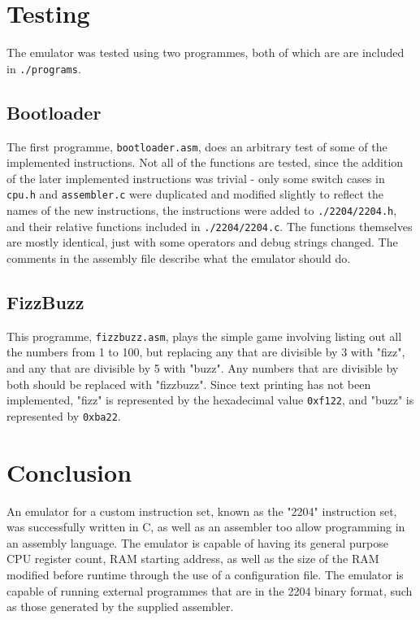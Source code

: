 \documentclass[a4paper,11pt]{article}
\begin{document}
\section{Testing}
    The emulator was tested using two programmes, both of which are are included in \lstinline{./programs}.
    
    \subsection{Bootloader}
        The first programme, \lstinline{bootloader.asm}, does an arbitrary test of some of the implemented instructions. Not all of the functions are tested, since the addition of the later implemented instructions was trivial - only some switch cases in \lstinline{cpu.h} and \lstinline{assembler.c} were duplicated and modified slightly to reflect the names of the new instructions, the instructions were added to \lstinline{./2204/2204.h}, and their relative functions included in \lstinline{./2204/2204.c}. The functions themselves are mostly identical, just with some operators and debug strings changed. The comments in the assembly file describe what the emulator should do.
    
    \subsection{FizzBuzz}
        This programme, \lstinline{fizzbuzz.asm}, plays the simple game involving listing out all the numbers from 1 to 100, but replacing any that are divisible by 3 with "fizz", and any that are divisible by 5 with "buzz". Any numbers that are divisible by both should be replaced with "fizzbuzz". Since text printing has not been implemented, "fizz" is represented by the hexadecimal value \lstinline{0xf122}, and "buzz" is represented by \lstinline{0xba22}.

\section{Conclusion}
    An emulator for a custom instruction set, known as the "2204" instruction set, was successfully written in C, as well as an assembler too allow programming in an assembly language. The emulator is capable of having its general purpose CPU register count, RAM starting address, as well as the size of the RAM modified before runtime through the use of a configuration file. The emulator is capable of running external programmes that are in the 2204 binary format, such as those generated by the supplied assembler.
\end{document}

